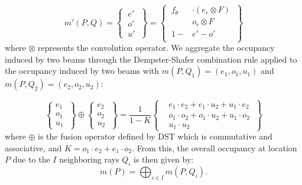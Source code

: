 \begin{equation}
 m'(P,Q)=\left\{\  \begin{aligned}
                 e'\\o'\\u'
                 \end{aligned}
\  \right\} = \left\{\  \begin{aligned}
                     f_\theta  &\cdot (e_r \otimes F)\\
                     &o_r \otimes F\\
                     1 - &e' - o'\\ 
                    \end{aligned}
\ \right\}
\end{equation}
where $\otimes$ represents the convolution operator.
We  aggregate the occupancy induced by two beams through the Dempster-Shafer combination rule applied to the occupancy induced by two beams with $m(P,Q_1)=(e_1, o_1, u_1)$ and $m(P,Q_2)=(e_2, o_2, u_2)$:

\begin{equation}
  \left\{ \begin{aligned}
                 e_1\  \\o_1\  \\u_1\ 
                \end{aligned}
 \right\} \oplus \left\{ \begin{aligned}
                     e_2\ \\o_2\ \\u_2\  
                    \end{aligned}
\right\} = \frac{1}{1-K} 
\left\{ 
  \begin{aligned}
     &e_1\cdot e_2 + e_1\cdot u_2 + u_1\cdot e_2 \ \\
     &o_1\cdot o_2 + o_1\cdot u_2 + u_1\cdot o_2 \ \\
     &u_1\cdot u_2 \ 
  \end{aligned}
 \right\}
\end{equation}
where $\oplus$ is the fusion operator defined by DST which is commutative and associative, and $K = o_1\cdot e_2 + e_1\cdot o_2$.
From this, the overall occupancy at location $P$ due to the $I$ neighboring rays $Q_i$ is then given by:
\begin{equation}
 m(P) = \bigoplus_{i\in I} m(P,Q_i).
\end{equation}

